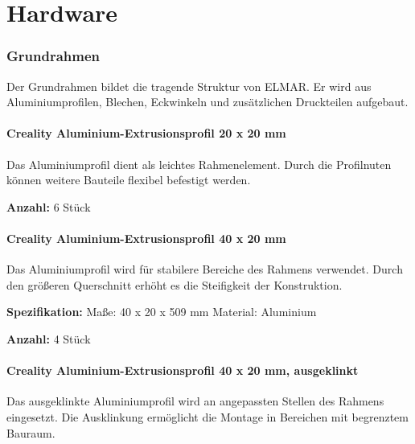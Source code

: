 %
%
%


\chapter{Hardware}

%
\subsection{Grundrahmen}

Der Grundrahmen bildet die tragende Struktur von ELMAR. Er wird aus Aluminiumprofilen, Blechen, Eckwinkeln und zusätzlichen Druckteilen aufgebaut.







\subsubsection{Creality Aluminium-Extrusionsprofil 20 x 20 mm}

Das Aluminiumprofil dient als leichtes Rahmenelement. Durch die Profilnuten können weitere Bauteile flexibel befestigt werden.




\textbf{Anzahl:} 6 Stück

\subsubsection{Creality Aluminium-Extrusionsprofil 40 x 20 mm}

Das Aluminiumprofil wird für stabilere Bereiche des Rahmens verwendet. Durch den größeren Querschnitt erhöht es die Steifigkeit der Konstruktion.

\textbf{Spezifikation:}
Maße: 40 x 20 x 509 mm
Material: Aluminium

\textbf{Anzahl:} 4 Stück

\subsubsection{Creality Aluminium-Extrusionsprofil 40 x 20 mm, ausgeklinkt}

Das ausgeklinkte Aluminiumprofil wird an angepassten Stellen des Rahmens eingesetzt. Die Ausklinkung ermöglicht die Montage in Bereichen mit begrenztem Bauraum.

